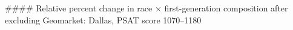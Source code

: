 #### Relative percent change in race × first-generation composition after excluding Geomarket: Dallas, PSAT score 1070–1180
